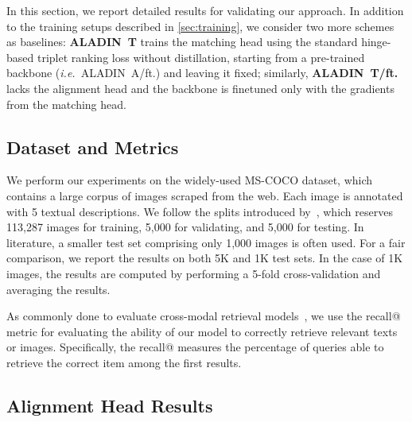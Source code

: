 \documentclass[sigconf]{acmart}
\def \ie {\emph{i.e.}}
\newcommand{\ourmodel}{ALADIN}    \settopmatter{authorsperrow=4}
\begin{document}
In this section, we report detailed results for validating our approach.
In addition to the training setups described in \ref{sec:training}, we consider two more schemes as baselines: \textbf{\ourmodel\ T} trains the matching head using the standard hinge-based triplet ranking loss without distillation, starting from a pre-trained backbone (\ie~\ourmodel\ A/ft.) and leaving it fixed; similarly, \textbf{\ourmodel\ T/ft.} lacks the alignment head and the backbone is finetuned only with the gradients from the matching head.


\subsection{Dataset and Metrics}
We perform our experiments on the widely-used MS-COCO dataset, which contains a large corpus of images scraped from the web. Each image is annotated with 5 textual descriptions. We follow the splits introduced by~\citep{karpathy2015alignment}, which reserves 113,287 images for training, 5,000 for validating, and 5,000 for testing. In literature, a smaller test set comprising only 1,000 images is often used. For a fair comparison, we report the results on both 5K and 1K test sets. In the case of 1K images, the results are computed by performing a 5-fold cross-validation and averaging the results.

As commonly done to evaluate cross-modal retrieval models~\citep{vsepp2018faghri,li2019,qi2020imagebert,lu2019vilbert,lee2019}, we use the recall@ metric for evaluating the ability of our model to correctly retrieve relevant texts or images. Specifically, the recall@ measures the percentage of queries able to retrieve the correct item among the first  results.



\subsection{Alignment Head Results}
\end{document}
